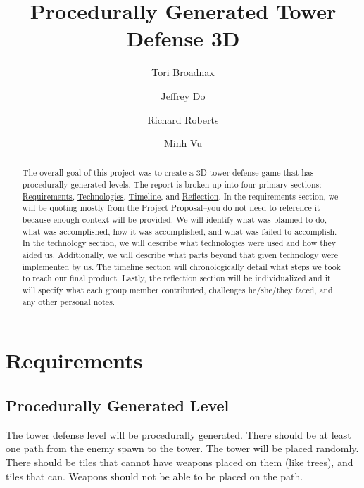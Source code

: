\documentclass{article}
\title{Procedurally Generated Tower Defense 3D}
\author[1]{Tori Broadnax}
\author[1]{Jeffrey Do}
\author[1]{Richard Roberts}
\author[1]{Minh Vu}
\affil[1]{George Mason University}
\begin{document}
\maketitle

\begin{abstract}
    The overall goal of this project was to create a 3D tower defense game that has procedurally generated levels. The report is broken up into four primary sections: \hyperref[sec:Requirements]{Requirements}, \hyperref[sec:Technologies]{Technologies}, \hyperref[sec:Timeline]{Timeline}, and \hyperref[sec:Reflection]{Reflection}. In the requirements section, we will be quoting mostly from the Project Proposal--you do not need to reference it because enough context will be provided. We will identify what was planned to do, what was accomplished, how it was accomplished, and what was failed to accomplish. In the technology section, we will describe what technologies were used and how they aided us. Additionally, we will describe what parts beyond that given technology were implemented by us. The timeline section will chronologically detail what steps we took to reach our final product. Lastly, the reflection section will be individualized and it will specify what each group member contributed, challenges he/she/they faced, and any other personal notes.
\end{abstract}

\newpage

\tableofcontents

\newpage

\section{Requirements}
\label{sec:Requirements}

\subsection{Procedurally Generated Level}
\label{Procedurally Generated Level}

\begin{displayquote}
    \small
    The tower defense level will be procedurally generated. There should be at least one path from the enemy spawn to the tower. The tower will be placed randomly. There should be tiles that cannot have weapons placed on them (like trees), and tiles that can. Weapons should not be able to be placed on the path.
\end{displayquote}
\end{document}
